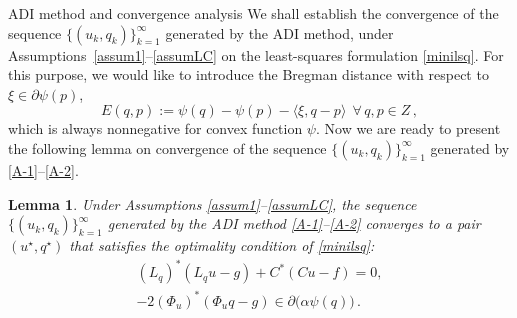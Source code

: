 \documentclass[11pt]{article}%
\renewcommand{\_}{{\fontfamily{ptm}\selectfont\textunderscore}}
\theoremstyle{plain}
\numberwithin{equation}{section}
\newtheorem{lemma}{Lemma}
\def\ra{\rangle} \def\la{\langle}
\begin{document}
\begin{section}{ADI method and convergence analysis}
We shall establish the convergence of the sequence $\{(u_k,q_k)\}_{k=1}^\infty$ generated by the ADI method, 
under Assumptions~\ref{assum1}--\ref{assumLC} on the least-squares formulation \eqref{minilsq}.  For this purpose, we would like to introduce the Bregman distance \cite{bregman1967relaxation} with respect to  $\xi\in\partial \psi(p)$,
\begin{equation}\label{breg}
E(q, p):=\psi(q)-\psi(p)-\la\xi,q- p\ra ~~\forall\, q, p\in Z\,,
\end{equation}
which is always nonnegative for convex function $\psi$. %
Now we are ready to present the following lemma on convergence of the sequence $\{(u_k,q_k)\}_{k=1}^\infty$ generated by \eqref{A-1}--\eqref{A-2}. 
\begin{lemma}
Under Assumptions \ref{assum1}--\ref{assumLC}, the sequence $\{(u_k,q_k)\}_{k=1}^\infty$ generated by the ADI method \eqref{A-1}--\eqref{A-2} converges to a pair $(u^\star, q^\star)$ that satisfies the optimality condition of \eqref{minilsq}:
\begin{equation} \label{nec}
\begin{aligned}
(L_q)^*(L_q u-g)+C^*(Cu-f)=0,
\\ 
-2(\Phi_u)^*(\Phi_u q-g) \in \partial\big(\alpha\psi(q)\big)\,.
\end{aligned} 
\end{equation}

\end{lemma}
\end{section}
\end{document}

